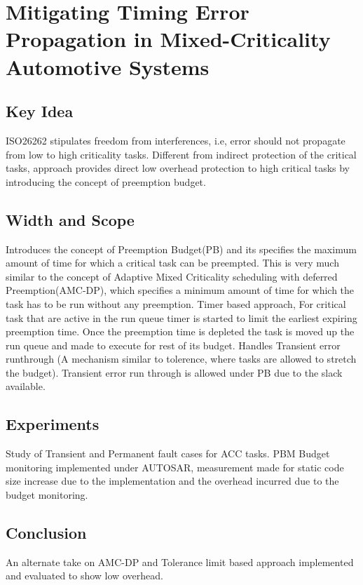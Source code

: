 \section{Mitigating Timing Error Propagation in	Mixed-Criticality Automotive Systems}
\subsection*{Key Idea}
ISO26262 stipulates freedom from interferences, i.e, error should not propagate from low to high criticality tasks.
Different from indirect protection of the critical tasks, approach provides direct low overhead protection to high critical tasks by introducing the concept of preemption budget.
\subsection*{Width and Scope}
Introduces the concept of Preemption Budget(PB) and its specifies the maximum amount of time for which a critical task can be preempted. This is very much similar to the concept of Adaptive Mixed Criticality scheduling with deferred Preemption(AMC-DP), which specifies a minimum amount of time for which the task has to be run without any preemption.
Timer based approach, For critical task that are active in the run queue timer is started to limit the earliest expiring preemption time. Once the preemption time is depleted the task is moved up the run queue and made to execute for rest of its budget.
Handles Transient error runthrough (A mechanism similar to tolerence, where tasks are allowed to stretch the budget). Transient error run through is allowed under PB due to the slack available.
\subsection*{Experiments}
Study of Transient and Permanent fault cases for ACC tasks.
PBM Budget monitoring implemented under AUTOSAR, measurement made for static code size increase due to the implementation and the overhead incurred due to the budget monitoring.
\subsection*{Conclusion}
An alternate take on AMC-DP and Tolerance limit based approach implemented and evaluated to show low overhead.